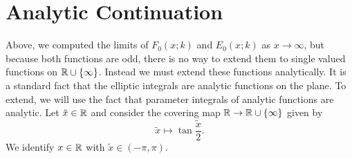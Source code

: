 \section{Analytic Continuation}
\label{sec:EllipticContinuation}

Above, we computed the limits of $F_0(x;k)$ and $E_0(x;k)$ as $x \to \infty$, but because both functions are odd, there is no way to extend them to single valued functions on $\RInf$. Instead we must extend these functions analytically. It is a standard fact that the elliptic integrals are analytic functions on the plane. To extend, we will use the fact that parameter integrals of analytic functions are analytic. Let $\tilde{x}\in\R$ and consider the covering map $\R \to \RInf$ given by
\[
\tilde{x} \mapsto \tan\frac{\tilde{x}}{2}.
\]
We identify $x\in\R$ with $\tilde{x} \in (-π,π)$.

